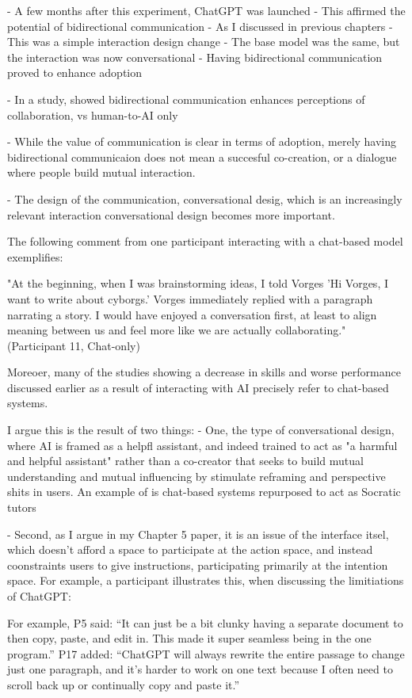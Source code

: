 - A few months after this experiment, ChatGPT was launched
- This affirmed the potential of bidirectional communication
- As I discussed in previous chapters
- This was a simple interaction design change
- The base model was the same, but the interaction was now conversational
- Having bidirectional communication proved to enhance adoption 

- In a study, \cite{Rezwana2022-gg} showed bidirectional communication enhances perceptions of collaboration, vs human-to-AI only

- While the value of communication is clear in terms of adoption, merely having bidirectional communicaion does not mean a succesful co-creation, or a dialogue where people build mutual interaction. 

- The design of the communication, conversational desig, which is an increasingly relevant interaction  conversational design becomes more important.

The following comment from one participant interacting with a chat-based model exemplifies: 

"At the beginning, when I was brainstorming ideas, I told Vorges ’Hi Vorges, I want to write about cyborgs.’
Vorges immediately replied with a paragraph narrating a story. I would have enjoyed a conversation first,
at least to align meaning between us and feel more like we are actually collaborating." (Participant 11, Chat-only)

Moreoer, many of the studies showing a decrease in skills and worse performance discussed earlier as a result of interacting with AI precisely refer to chat-based systems. 

I argue this is the result of two things: 
- One, the type of conversational design, where AI is framed as a helpfl assistant, and indeed trained to act as "a harmful and helpful assistant" \cite{Bai2022-ec, Ouyang2022-af} rather than a co-creator that seeks to build mutual understanding and mutual influencing by stimulate reframing and perspective shits in users. An example of is chat-based systems repurposed to act as Socratic tutors  \cite{Kim2023-wt}

- Second, as I argue in my Chapter 5 paper, it is an issue of the interface itsel, which doesn't afford a space to participate at the action space, and instead coonstraints users to give instructions, participating primarily at the intention space. For example, a participant illustrates this, when discussing the limitiations of ChatGPT: 

For example, P5 said: “It can just be a bit clunky having a separate document to then copy, paste, and edit in. This
made it super seamless being in the one program.”
P17 added: “ChatGPT will always rewrite the entire passage to change just one paragraph, and it’s harder to work on one text because I often need to scroll back up or continually copy and paste it.”


